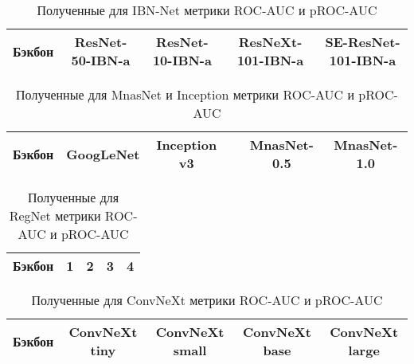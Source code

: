 \documentclass{article}
\begin{document}
\begin{large}
\begin{table}
\begin{tabular}{| l | c | c | c | c | c |}
		\hline
	\end{tabular}
\end{table}

\begin{table}
	\caption{Полученные для IBN-Net метрики ROC-AUC и pROC-AUC}\label{tab_ibn}
	\centering
	\begin{tabular}{| p{2.5cm} | c | c | c | c |}
		\hline
		Бэкбон & ResNet-50-IBN-a & ResNet-10-IBN-a & ResNeXt-101-IBN-a & SE-ResNet-101-IBN-a \\ \hline
		
		\hline
	\end{tabular}
\end{table}

\begin{table}
	\caption{Полученные для MnasNet и Inception метрики ROC-AUC и pROC-AUC}\label{tab_mnas}
	\centering
	\begin{tabular}{| p{2.5cm} | c | c | c | c | c |}
		\hline
		Бэкбон & GoogLeNet & Inception v3 & & MnasNet-0.5 & MnasNet-1.0 \\ \hline
		
		\hline
	\end{tabular}
\end{table}

\begin{table}
	\caption{Полученные для RegNet метрики ROC-AUC и pROC-AUC}\label{tab_reg}
	\centering
	\begin{tabular}{| p{2.5cm} | c | c | c | c |}
		\hline
		Бэкбон & 1 & 2 & 3 & 4 \\ \hline
		
		\hline
	\end{tabular}
\end{table}

\begin{table}
	\caption{Полученные для ConvNeXt метрики ROC-AUC и pROC-AUC}\label{tab_conv}
	\centering
	\begin{tabular}{| p{2.5cm} | c | c | c | c |}
		\hline
		Бэкбон & ConvNeXt tiny & ConvNeXt small & ConvNeXt base & ConvNeXt large \\ \hline
		
		\hline
	\end{tabular}
\end{table}

\end{large}
\end{document}
